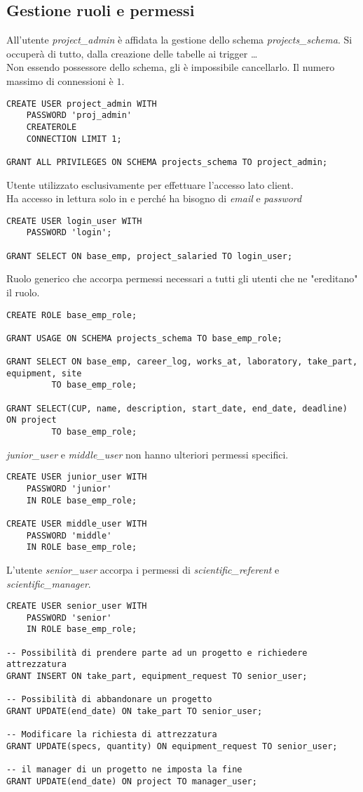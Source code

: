 \subsection{Gestione ruoli e permessi}
All'utente \textit{project\_admin} è affidata la gestione dello schema \textit{projects\_schema}. Si occuperà di tutto, dalla creazione delle tabelle ai trigger \dots\\
Non essendo possessore dello schema, gli è impossibile cancellarlo.\sskip
Il numero massimo di connessioni è $1$.
\begin{lstlisting}
CREATE USER project_admin WITH 
    PASSWORD 'proj_admin'
    CREATEROLE
    CONNECTION LIMIT 1;

GRANT ALL PRIVILEGES ON SCHEMA projects_schema TO project_admin;
\end{lstlisting}\medskip
Utente utilizzato esclusivamente per effettuare l'accesso lato client.\\
Ha accesso in lettura solo in \textit{\baseemp} e \textit{\projectsalaried} perché ha bisogno di \textit{email} e \textit{password}
\begin{lstlisting}
CREATE USER login_user WITH
	PASSWORD 'login';

GRANT SELECT ON base_emp, project_salaried TO login_user;
\end{lstlisting}
\newpage \noindent
Ruolo generico che accorpa permessi necessari a tutti gli utenti che ne "ereditano" il ruolo.
\begin{lstlisting}
CREATE ROLE base_emp_role;

GRANT USAGE ON SCHEMA projects_schema TO base_emp_role;

GRANT SELECT ON base_emp, career_log, works_at, laboratory, take_part, equipment, site 
	     TO base_emp_role;

GRANT SELECT(CUP, name, description, start_date, end_date, deadline) ON project 
	     TO base_emp_role;
\end{lstlisting}\medskip
\textit{junior\_user} e \textit{middle\_user} non hanno ulteriori permessi specifici.
\begin{lstlisting}
CREATE USER junior_user WITH 
	PASSWORD 'junior'
	IN ROLE base_emp_role;

CREATE USER middle_user WITH
	PASSWORD 'middle'
	IN ROLE base_emp_role;
\end{lstlisting}\medskip
L'utente \textit{senior\_user} accorpa i permessi di \textit{scientific\_referent} e \textit{scientific\_manager}.
\begin{lstlisting}
CREATE USER senior_user WITH
	PASSWORD 'senior'
	IN ROLE base_emp_role;

-- Possibilità di prendere parte ad un progetto e richiedere attrezzatura
GRANT INSERT ON take_part, equipment_request TO senior_user; 

-- Possibilità di abbandonare un progetto
GRANT UPDATE(end_date) ON take_part TO senior_user;

-- Modificare la richiesta di attrezzatura
GRANT UPDATE(specs, quantity) ON equipment_request TO senior_user;

-- il manager di un progetto ne imposta la fine
GRANT UPDATE(end_date) ON project TO manager_user; 
\end{lstlisting}
